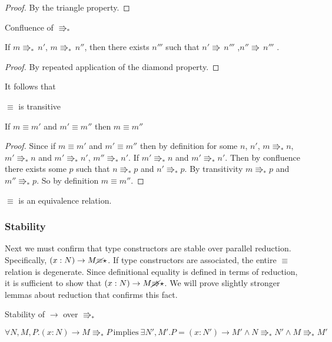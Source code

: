 \begin{proof}
By the triangle property.
\end{proof}
\begin{thm}
Confluence of $\Rrightarrow_{\ast}$
 
If $m\Rrightarrow_{\ast}\,n'$, $m\Rrightarrow_{\ast}\,n''$, then
there exists $n'''$ such that $n'\Rrightarrow\,n'''$ ,$n''\Rrightarrow\,n'''$
.
\end{thm}
 
\begin{proof}
By repeated application of the diamond property.
\end{proof}
It follows that
\begin{thm}
$\equiv$ is transitive
 
If $m\equiv m'$ and $m'\equiv m''$ then $m\equiv m''$
\end{thm}
 
\begin{proof}
Since if $m\equiv m'$ and $m'\equiv m''$ then by definition for some $n$, $n'$, $m\Rrightarrow_{\ast}n$, $m'\Rrightarrow_{\ast}n$ and $m'\Rrightarrow_{\ast}n'$, $m''\Rrightarrow_{\ast}n'$. If $m'\Rrightarrow_{\ast}n$ and $m'\Rrightarrow_{\ast}n'$.
Then by confluence there exists some $p$ such that $n\Rrightarrow_{\ast}p$ and $n'\Rrightarrow_{\ast}p$.
By transitivity $m\Rrightarrow_{\ast}p$ and $m''\Rrightarrow_{\ast}p$.
So by definition $m\equiv m''$.
\end{proof}
\begin{fact}
$\equiv$ is an equivalence relation.
\end{fact}
 
 
\subsubsection{Stability}
Next we must confirm that type constructors are stable over parallel reduction.
Specifically, $\left(x:N\right)\rightarrow M\cancel{\equiv}\star$.
If type constructors are associated, the entire $\equiv$ relation is degenerate.
Since definitional equality is defined in terms of reduction, it is sufficient to show that $\left(x:N\right)\rightarrow M\cancel{\Rrightarrow}\star$.
We will prove slightly stronger lemmas about reduction that confirms this fact.
 
\begin{lem}
Stability of $\rightarrow$ over $\Rrightarrow_{\ast}$
 
$\forall N,M,P.\left(x:N\right)\rightarrow M\Rrightarrow_{\ast}P\:\mathrm{implies}\:\exists N',M'.P=\left(x:N'\right)\rightarrow M'\land N\Rrightarrow_{\ast}N'\land M\Rrightarrow_{\ast}M'$
\end{lem}
 
